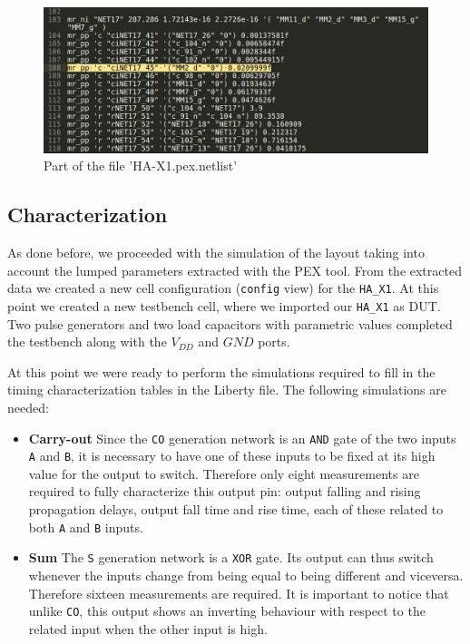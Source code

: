 \documentclass[a4paper]{article}
\newcommand{\ha}{\texttt{HA\_X1}\xspace}
\begin{document}
\begin{figure}[H]
      \centering
       \includegraphics[width=12cm]{./Images/HA/HAX1_PEX_netlist.png}
\caption{Part of the file 'HA-X1.pex.netlist'}
\label{fig: PEX0_netlist}
\end{figure}


\subsection{Characterization}
As done before, we proceeded with the simulation of the layout taking into account the lumped parameters extracted with the PEX tool. From the extracted data we created a new cell configuration (\texttt{config} view) for the \ha. At this point we created a new testbench cell, where we imported our \ha as DUT. Two pulse generators and two load capacitors with parametric values completed the testbench along with the $V_{DD}$ and $GND$ ports.

At this point we were ready to perform the simulations required to fill in the timing characterization tables in the Liberty file. The following simulations are needed:
\begin{itemize}
	\item \textbf{Carry-out} Since the \texttt{CO} generation network is an \texttt{AND} gate of the two inputs \texttt{A} and \texttt{B}, it is necessary to have one of these inputs to be fixed at its high value for the output to switch. Therefore only eight measurements are required to fully characterize this output pin: output falling and rising propagation delays, output fall time and rise time, each of these related to both \texttt{A} and \texttt{B} inputs.

	\item \textbf{Sum} The \texttt{S} generation network is a \texttt{XOR} gate. Its output can thus switch whenever the inputs change from being equal to being different and viceversa. Therefore sixteen measurements are required. It is important to notice that unlike \texttt{CO}, this output shows an inverting behaviour with respect to the related input when the other input is high.
\end{itemize}
\end{document}
